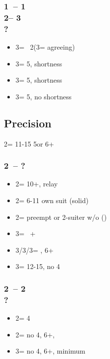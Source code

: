 \documentclass[12pt, a4paper]{report}
\begin{document}
\begin{bidpage}
\subsubsection*{1\clubs\ -- 1\hearts\\
                2\nt -- 3\clubs\\
                ?}
\begin{itemize}
    \item 3\diams = \bal\ 2\hearts (3\hearts = agreeing)
    \item 3\hearts = 5\diams, \hearts shortness
    \item 3\spades = 5\diams, \spades shortness
    \item 3\nt = 5\diams, no shortness
\end{itemize}
\end{bidpage}

\begin{bidpage}
\section{Precision}

2\clubs = 11-15 5\major or 6+\clubs

\subsubsection*{2\clubs\ -- ?}
\begin{itemize}
    \item 2\diams = 10+, relay
    \item 2\major = 6-11 own suit (solid)
    \item 2\nt = preempt \clubs or 2-suiter w/o \clubs (\clubs)
    \item 3\clubs = \inv\ + \clubs
    \item 3\diams/3\hearts/3\spades = \inv, 6+
    \item 3\nt = 12-15, no 4\major
\end{itemize}
\end{bidpage}

\begin{bidpage}
\subsubsection*{2\clubs\ -- 2\diams\\
                ?}
\begin{itemize}
    \item 2\major = 4\major
    \item 2\nt = no 4\major, 6+\clubs, \gf
    \item 3\clubs = no 4\major, 6+\clubs, minimum
\end{itemize}
\end{bidpage}
\end{document}
